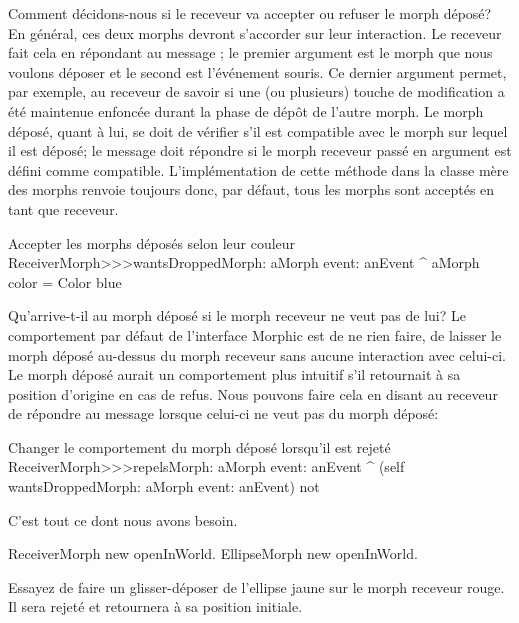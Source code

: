\documentclass[a4paper,10pt,twoside]{book}
\begin{document}
Comment décidons-nous si le receveur va accepter ou refuser le morph
déposé? En général, ces deux morphs devront s'accorder sur
leur interaction. Le receveur fait cela en répondant au message
 ; le premier argument est le
 morph que nous voulons déposer et le second est l'événement
 souris. Ce dernier argument permet, par exemple, au receveur de
 savoir si une (ou plusieurs) touche de modification a été
 maintenue enfoncée durant la phase de dépôt de l'autre morph.
Le morph déposé, quant à lui, se doit de vérifier s'il est
compatible avec le morph sur lequel il est déposé; le message
 doit répondre  si le morph
receveur 
passé en argument est défini comme compatible. L'implémentation
de cette méthode dans la classe mère des morphs  renvoie
toujours  
donc, par défaut, tous les morphs sont acceptés en tant que
receveur.

\begin{method}{Accepter les morphs déposés selon leur couleur}
ReceiverMorph>>>wantsDroppedMorph: aMorph event: anEvent
	^ aMorph color = Color blue
\end{method}

Qu'arrive-t-il au morph déposé si le morph receveur ne veut pas de lui?
Le comportement par défaut de l'interface Morphic est de ne rien
faire, \cad de laisser le morph déposé au-dessus du morph receveur
sans aucune interaction avec celui-ci. 
Le morph déposé aurait un comportement plus intuitif s'il
retournait à sa position d'origine en cas de refus.
Nous pouvons faire cela en disant au receveur de répondre 
au message   lorsque celui-ci ne
veut pas du morph déposé:

\begin{method}{Changer le comportement du morph déposé lorsqu'il est rejeté}
ReceiverMorph>>>repelsMorph: aMorph event: anEvent
	^ (self wantsDroppedMorph: aMorph event: anEvent) not
\end{method}

C'est tout ce dont nous avons besoin.

\begin{code}{}
ReceiverMorph new openInWorld.
EllipseMorph new openInWorld.
\end{code}
\noindent
Essayez de faire un glisser-déposer de l'ellipse jaune
 sur le morph receveur rouge. Il sera rejeté et
retournera à sa position initiale.
\end{document}
